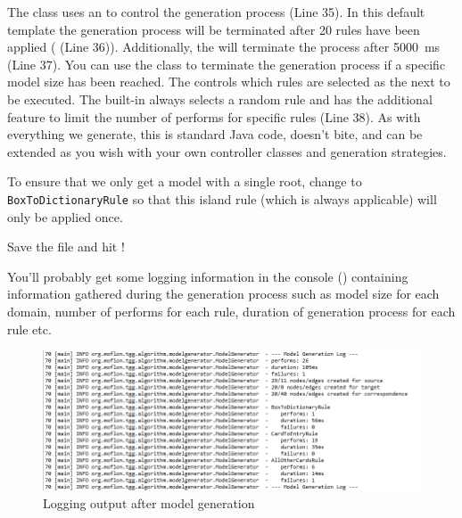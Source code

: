The  class uses an  to control the generation process (Line 35). 
In this default template the generation process will be terminated after 20 rules have been applied ( (Line 36)). 
Additionally, the  will terminate the process after \SI{5000}{\milli\second} (Line 37). 
You can use the  class to terminate the generation process if a specific model size has been reached. 
The  controls which rules are selected as the next to be executed. 
The built-in  always selects a random rule and has the additional feature to limit the number of performs for specific rules (Line 38).
As with everything we generate, this is standard Java code, doesn't bite, and can be extended as you wish with your own controller classes and generation strategies.

\begin{stepbystep}

\item  To ensure that we only get a model with a single root, change  to \texttt{BoxToDictionaryRule} so that this island rule (which is always applicable) will only be applied once.

\item Save the file and hit !

You'll probably get some logging information in the console () containing information gathered during the generation process such as model size for each domain, number of performs for each rule, duration of generation process for each rule etc.

\end{stepbystep}


\begin{figure}[htbp]
\renewcommand\figurename{Figure} 
\begin{center}
\includegraphics[width=1\textwidth]{../../org.moflon.doc.handbook.04_tripleGraphTransformations/9_modelgen/images/eclipse_example_logging.png}
\caption{Logging output after model generation}
\label{eclipse:modelgen_log}
\end{center}
\end{figure}

